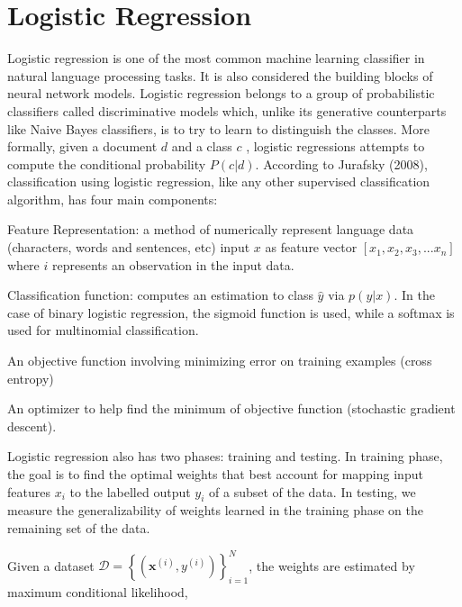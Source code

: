  \section{Logistic Regression}
 Logistic regression is one of the most common machine learning classifier in natural language processing tasks. It is also considered the building blocks of neural network models. Logistic regression belongs to a group of probabilistic classifiers called discriminative models which, unlike its generative counterparts like Naive Bayes classifiers, is to try to learn to distinguish the classes. More formally, given a document $d$ and a class $c$ , logistic regressions attempts to compute the conditional probability $P(c|d)$. 
 According to Jurafsky (2008), classification using logistic regression, like any other supervised classification algorithm, has four main components: 

\begin{list}{•}{}
 \item Feature Representation: a method of numerically represent language data (characters, words and sentences, etc) input $x$ as feature vector $[x_{1},x_{2},x_{3},...x_{n}]$ where $i$  represents an observation in the input data.

\item Classification function: computes an estimation to class $\hat{y}$ via $p(y|x)$. In the case of binary logistic regression, the sigmoid function is used, while a softmax is used for multinomial classification. 
 
\item An objective function involving minimizing error on training examples (cross entropy)

\item An optimizer to help find the minimum of objective function 
 (stochastic gradient descent).
 \end{list}

Logistic regression also has two phases: training and testing. In training phase, the goal is to find the optimal weights that best account for mapping input features $x_{i}$ to the labelled output $y_{i}$ of a subset of the data. In testing, we measure the generalizability of weights learned in the training phase on the remaining set of the data.

Given a dataset $\mathcal { D } = \left\{ \left( \boldsymbol { x } ^ { ( i ) } , y ^ { ( i ) } \right) \right\} _ { i = 1 } ^ { N }$, the weights  are estimated by maximum conditional likelihood, 

